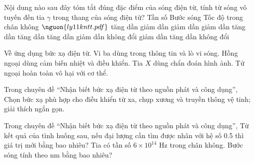 \begin{ex}
Nội dung nào sau đây tóm tắt đúng đặc điểm của sóng điện từ, tính từ sóng vô tuyến đến tia $\gamma$ trong thang của sóng điện từ? Tần số Bước sóng Tốc độ trong chân không $\nguon{ly11 kntt.pdf}$
\choice
{tăng dần giảm dần giảm dần}
{giảm dần tăng dần tăng dần}
{\True tăng dần giảm dần không đổi}
{giảm dần tăng dần không đổi}
\end{ex}

\begin{ex}
Về ứng dụng bức xạ điện từ.
\choiceTF
{\True Vi ba dùng trong thông tin và lò vi sóng.}
{\True Hồng ngoại dùng cảm biến nhiệt và điều khiển.}
{\True Tia $X$ dùng chẩn đoán hình ảnh.}
{Tử ngoại hoàn toàn vô hại với cơ thể.}
\end{ex}

\begin{ex}
Trong chuyên đề “Nhận biết bức xạ điện từ theo nguồn phát và công dụng”, Chọn bức xạ phù hợp cho điều khiển từ xa, chụp xương và truyền thông vệ tinh; giải thích ngắn gọn.
\choiceTF

\end{ex}

\begin{ex}
Trong chuyên đề “Nhận biết bức xạ điện từ theo nguồn phát và công dụng”, Từ kết quả của tình huống sau, nếu đại lượng cần tìm được nhân với hệ số 0.5 thì giá trị mới bằng bao nhiêu? Tia có tần số $6\times10^{14}$ Hz trong chân không. Bước sóng tính theo nm bằng bao nhiêu?
\end{ex}


